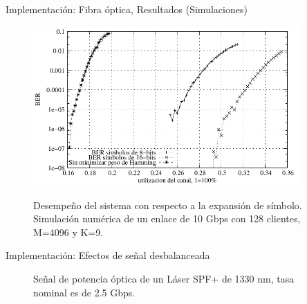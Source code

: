\documentclass[aspectratio=169]{beamer}
\begin{document}
\begin{frame}{Implementación: Fibra óptica, Resultados (Simulaciones)}

\begin{figure}[!t]
  \centering
    \includegraphics[width=4in]{../graphs/BERvsChannelES2}
    
    Desempeño del sistema con respecto a la expansión de símbolo. Simulación numérica de un enlace de 10 Gbps con 128 clientes, M=4096 y K=9.
    \label{BERvsExpansion}
\end{figure}

\end{frame}


\begin{frame}{Implementación: Efectos de señal desbalanceada}


\begin{figure}[!t]
   \centering
   \qquad
   \qquad
   
  \vspace{0.2cm}
  Señal de potencia óptica de un Láser SPF+ de 1330 nm, tasa nominal es de 2.5 Gbps.
  \label{fig:ImgExpansion}
\end{figure}
\end{frame}
\end{document}
